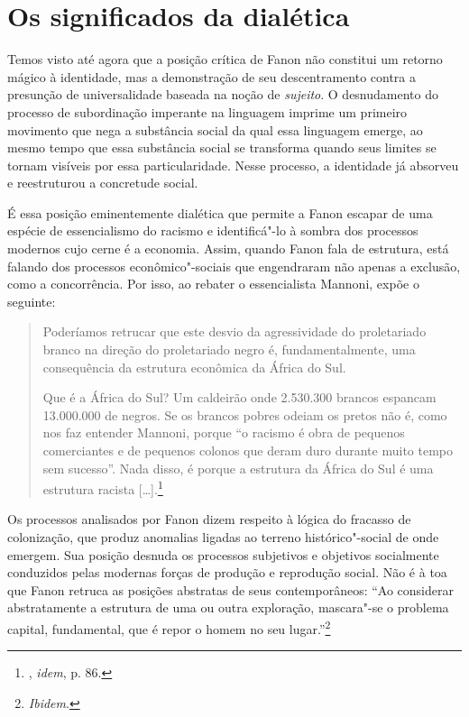 \chapter{Os significados da dialética}

Temos visto até agora que a posição crítica de Fanon não constitui um
retorno mágico à identidade, mas a demonstração de seu descentramento
contra a presunção de universalidade baseada na noção de \emph{sujeito}.
O desnudamento do processo de subordinação imperante na linguagem
imprime um primeiro movimento que nega a substância social da qual essa
linguagem emerge, ao mesmo tempo que essa substância social se
transforma quando seus limites se tornam visíveis por essa
particularidade. Nesse processo, a identidade já absorveu e reestruturou
a concretude social.

É essa posição eminentemente dialética que permite a Fanon escapar de
uma espécie de essencialismo do racismo e identificá"-lo à sombra dos
processos modernos cujo cerne é a economia. Assim, quando Fanon fala de
estrutura, está falando dos processos econômico"-sociais que engendraram
não apenas a exclusão, como a concorrência. Por isso, ao rebater o
essencialista Mannoni, expõe o seguinte:

\begin{quote}
Poderíamos retrucar que este desvio da agressividade do proletariado
branco na direção do proletariado negro é, fundamentalmente, uma
consequência da estrutura econômica da África do Sul.

Que é a África do Sul? Um caldeirão onde 2.530.300 brancos espancam
13.000.000 de negros. Se os brancos pobres odeiam os pretos não é, como
nos faz entender Mannoni, porque ``o racismo é obra de pequenos
comerciantes e de pequenos colonos que deram duro durante muito tempo
sem sucesso''. Nada disso, é porque a estrutura da África do Sul é uma
estrutura racista [\ldots{}].\footnote{, \emph{idem}, p. 86.}
\end{quote}

Os processos analisados por Fanon dizem respeito à lógica do fracasso de
colonização, que produz anomalias ligadas ao terreno histórico"-social de
onde emergem. Sua posição desnuda os processos subjetivos e objetivos
socialmente conduzidos pelas modernas forças de produção e reprodução
social. Não é à toa que Fanon retruca as posições abstratas de seus
contemporâneos: ``Ao considerar abstratamente a estrutura de uma ou
outra exploração, mascara"-se o problema capital, fundamental, que é
repor o homem no seu lugar.''\footnote{\emph{Ibidem}.}

